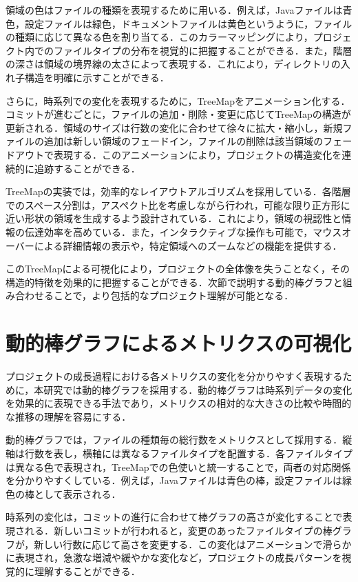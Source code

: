 \documentclass[12pt,twoside]{jbook}
\begin{document}
領域の色はファイルの種類を表現するために用いる．例えば，Javaファイルは青色，設定ファイルは緑色，ドキュメントファイルは黄色というように，ファイルの種類に応じて異なる色を割り当てる．このカラーマッピングにより，プロジェクト内でのファイルタイプの分布を視覚的に把握することができる．また，階層の深さは領域の境界線の太さによって表現する．これにより，ディレクトリの入れ子構造を明確に示すことができる．

さらに，時系列での変化を表現するために，TreeMapをアニメーション化する．コミットが進むごとに，ファイルの追加・削除・変更に応じてTreeMapの構造が更新される．領域のサイズは行数の変化に合わせて徐々に拡大・縮小し，新規ファイルの追加は新しい領域のフェードイン，ファイルの削除は該当領域のフェードアウトで表現する．このアニメーションにより，プロジェクトの構造変化を連続的に追跡することができる．

TreeMapの実装では，効率的なレイアウトアルゴリズムを採用している．各階層でのスペース分割は，アスペクト比を考慮しながら行われ，可能な限り正方形に近い形状の領域を生成するよう設計されている．これにより，領域の視認性と情報の伝達効率を高めている．また，インタラクティブな操作も可能で，マウスオーバーによる詳細情報の表示や，特定領域へのズームなどの機能を提供する．

このTreeMapによる可視化により，プロジェクトの全体像を失うことなく，その構造的特徴を効果的に把握することができる．次節で説明する動的棒グラフと組み合わせることで，より包括的なプロジェクト理解が可能となる．

\section{動的棒グラフによるメトリクスの可視化}
プロジェクトの成長過程における各メトリクスの変化を分かりやすく表現するために，本研究では動的棒グラフを採用する．動的棒グラフは時系列データの変化を効果的に表現できる手法であり，メトリクスの相対的な大きさの比較や時間的な推移の理解を容易にする．

動的棒グラフでは，ファイルの種類毎の総行数をメトリクスとして採用する．縦軸は行数を表し，横軸には異なるファイルタイプを配置する．各ファイルタイプは異なる色で表現され，TreeMapでの色使いと統一することで，両者の対応関係を分かりやすくしている．例えば，Javaファイルは青色の棒，設定ファイルは緑色の棒として表示される．

時系列の変化は，コミットの進行に合わせて棒グラフの高さが変化することで表現される．新しいコミットが行われると，変更のあったファイルタイプの棒グラフが，新しい行数に応じて高さを変更する．この変化はアニメーションで滑らかに表現され，急激な増減や緩やかな変化など，プロジェクトの成長パターンを視覚的に理解することができる．
\end{document}
